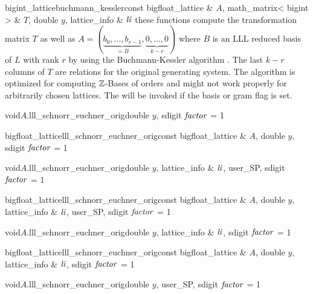 \begin{fcode}{bigint_lattice}{buchmann_kessler}{const bigfloat_lattice & $A$,
    math_matrix< bigint > & $T$, double $y$, lattice_info & $\mathit{li}$}%
  these functions compute the transformation matrix $T$ as well as $A = (\underbrace{b_0, \dots,
    b_{r-1}}_{=B}, \underbrace{0, \dots, 0}_{k-r})$ where $B$ is an LLL reduced basis of $L$
  with rank $r$ by using the Buchmann-Kessler algorithm \cite{Buchmann/Kessler:1992}.  The last
  $k-r$ columns of $T$ are relations for the original generating system.  The algorithm is
  optimized for computing $\mathbb{Z}$-Bases of orders and might not work properly for arbitrarily
  chosen lattices.  The \LEH will be invoked if the basis or gram flag is set.
\end{fcode}



\begin{fcode}{void}{$A$.lll_schnorr_euchner_orig}{double $y$, sdigit $\mathit{factor}$ = 1}
\end{fcode}

\begin{fcode}{bigfloat_lattice}{lll_schnorr_euchner_orig}{const bigfloat_lattice & $A$,
    double $y$, sdigit $\mathit{factor}$ = 1}%
\end{fcode}

\begin{fcode}{void}{$A$.lll_schnorr_euchner_orig}{double $y$, lattice_info & $\mathit{li}$,
    user_SP, sdigit $\mathit{factor}$ = 1}%
\end{fcode}

\begin{fcode}{bigfloat_lattice}{lll_schnorr_euchner_orig}{const bigfloat_lattice & $A$,
    double $y$, lattice_info & $\mathit{li}$, user_SP, sdigit $\mathit{factor}$ = 1}%
\end{fcode}

\begin{fcode}{void}{$A$.lll_schnorr_euchner_orig}{double $y$, lattice_info & $\mathit{li}$,
    sdigit $\mathit{factor}$ = 1}%
\end{fcode}

\begin{fcode}{bigfloat_lattice}{lll_schnorr_euchner_orig}{const bigfloat_lattice & $A$,
    double $y$, lattice_info & $\mathit{li}$, sdigit $\mathit{factor}$ = 1}%
\end{fcode}

\begin{fcode}{void}{$A$.lll_schnorr_euchner_orig}{double $y$, user_SP, sdigit $\mathit{factor}$ = 1}
\end{fcode}

